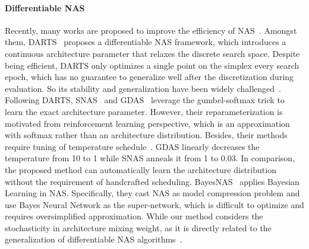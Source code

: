\documentclass{article} \usepackage{iclr2021_conference,times}
\begin{document}
\paragraph{Differentiable NAS} Recently, many works are proposed to improve the efficiency of NAS~\citep{enas,morphisms,darts,oneshot,nasp,sif,Mei2020AtomNAS}.
Amongst them, DARTS~\citep{darts} proposes a differentiable NAS framework, which introduces a continuous architecture parameter that relaxes the discrete search space. Despite being efficient, DARTS only optimizes a single point on the simplex every search epoch, which has no guarantee to generalize well after the discretization during evaluation. So its stability and generalization have been widely challenged~\citep{randomnas,understanding,smoothdarts,wang2021rethinking}.
Following DARTS, SNAS~\citep{snas} and GDAS~\citep{gdas} leverage the gumbel-softmax trick to learn the exact architecture parameter.
However, their reparameterization is motivated from reinforcement learning perspective, which is an approximation with softmax rather than an architecture distribution.
Besides, their methods require tuning of temperature schedule~\citep{hman, mann}. GDAS linearly decreases the temperature from 10 to 1 while SNAS anneals it from 1 to 0.03. In comparison, the proposed method can automatically learn the architecture distribution without the requirement of handcrafted scheduling.
BayesNAS~\citep{BayesNAS} applies Bayesian Learning in NAS. Specifically, they cast NAS as model compression problem and use Bayes Neural Network as the super-network, which is difficult to optimize and requires oversimplified approximation. While our method considers the stochasticity in architecture mixing weight, as it is directly related to the generalization of differentiable NAS algorithms~\citep{understanding, smoothdarts}.
\end{document}
